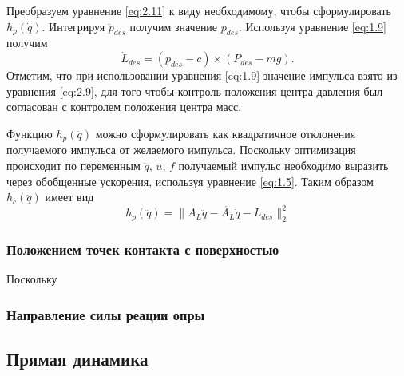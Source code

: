 Преобразуем уравнение \ref{eq:2.11} к виду необходимому, чтобы сформулировать $h_p(\dot{q})$. Интегрируя $\ddot{p}_{des}$ получим значение $p_{des}$. Используя уравнение \ref{eq:1.9} получим
\begin{equation*}
  \dot{L}_{des} = (p_{des} - c) \times (P_{des} - mg). \tag{2.12}\label{eq:2.12}
\end{equation*}
Отметим, что при использовании уравнения \ref{eq:1.9} значение импульса взято из уравнения \ref{eq:2.9}, для того чтобы контроль положения центра давления был согласован с контролем положения центра масс.

Функцию $h_{p}(\ddot{q})$ можно сформулировать как квадратичное отклонения получаемого импульса от желаемого импульса. Поскольку оптимизация происходит по переменным $\ddot{q}$, $u$, $f$ получаемый импульс необходимо выразить через обобщенные ускорения, используя уравнение \ref{eq:1.5}. Таким образом $h_c(\ddot{q})$ имеет вид
\begin{equation*}
  h_{p}(\ddot{q}) = \lVert A_{L}\ddot{q} - \dot{A_{L}} \dot{q} - L_{des} \rVert_{2}^{2} \tag{2.13}\label{eq:2.13}
\end{equation*}

\subsubsection{Положением точек контакта с поверхностью}

Поскольку 


\subsubsection{Направление силы реации опры}

\subsection{Прямая динамика}




